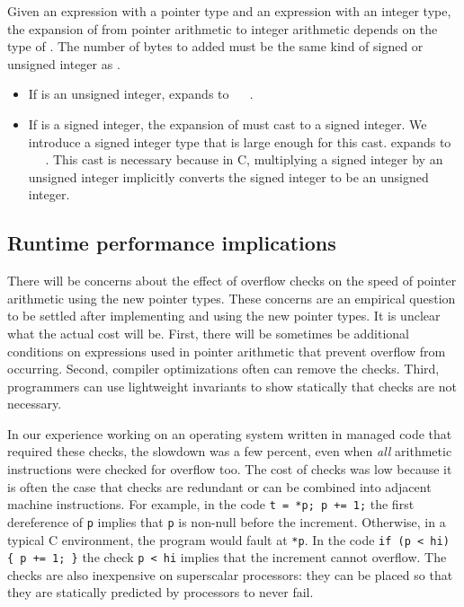 Given an expression  with a pointer type and an expression
 with an integer type, the expansion of  from
pointer arithmetic to integer arithmetic depends on the type of
. The number of bytes to added must be the same kind of
signed or unsigned integer as .

\begin{itemize}
\item
  If  is an unsigned integer,  expands to
   \plusovf\  \mulovf\ .
\item
  If  is a signed integer, the expansion of 
  must cast  to a signed integer. We introduce a
  signed integer type  that is large enough for
  this cast.  expands to  \plusovf\ 
   \code{)} \plusovf\ . This cast is
  necessary because in C, multiplying a signed integer by an unsigned
  integer implicitly converts the signed integer to be an unsigned
  integer.
\end{itemize}

\subsection{Runtime performance implications}

There will be concerns about the effect of overflow checks on the speed
of pointer arithmetic using the new pointer types. These concerns are an
empirical question to be settled after implementing and using the new
pointer types. It is unclear what the actual cost will be. First, there
will be sometimes be additional conditions on expressions used in
pointer arithmetic that prevent overflow from occurring. Second,
compiler optimizations often can remove the checks. Third, programmers
can use lightweight invariants to show statically that checks are not
necessary.

In our experience working on an operating system written in managed code
that required these checks, the slowdown was a few percent, even when
\emph{all} arithmetic instructions were checked for overflow too. The
cost of checks was low because it is often the case that checks are
redundant or can be combined into adjacent machine instructions. For
example, in the code \lstinline|t = *p; p += 1;| the first dereference of
\lstinline+p+ implies that \lstinline+p+ is non-null before the increment.
Otherwise, in a typical C environment, the program would fault at
\lstinline+*p+. In the code \lstinline|if (p < hi) { p += 1; }|
the check \lstinline+p < hi+ implies that the increment cannot
overflow. The checks are also inexpensive on superscalar processors:
they can be placed so that they are statically predicted by 
processors to never fail.

